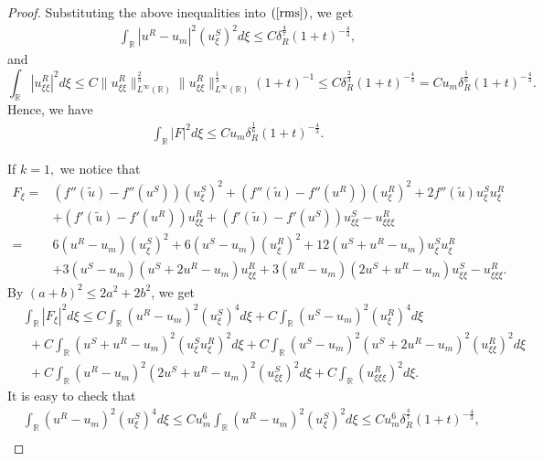 \documentclass[10pt,reqno]{amsart}
\numberwithin{equation}{section}
\begin{document}
\begin{proof}
		Substituting the above inequalities into $(\ref{rms})$, we get
		\begin{align*}
			\int_{\mathbb{R}} |u^R - u_m|^2 (u_{\xi}^S)^2 d\xi\leq C\delta_R^{\frac{4}{7}}(1+t)^{-\frac{4}{3}},
		\end{align*}
		and
		\begin{equation*} 
			\int_{\mathbb{R}} |u_{\xi \xi}^{R}|^2 d\xi \leq C \|u_{\xi \xi}^{R}\|_{L^\infty(\mathbb{R})}^{\frac{2}{3}} \|u_{\xi \xi}^{R}\|_{L^\infty(\mathbb{R})}^{\frac{1}{3}} (1+t)^{-1} \leq C\delta_R^{\frac{2}{3}} (1+t)^{-\frac{4}{3}}=Cu_m\delta_{R}^{\frac{1}{6}}(1+t)^{-\frac{4}{3}}.
		\end{equation*}
		Hence, we have
		\begin{align*}
			\int_{\mathbb{R}} |F|^2 d\xi\leq Cu_m\delta_R^{\frac{1}{6}}(1+t)^{-\frac{4}{3}}.
		\end{align*}\par
		If $k=1,$ we notice that
		\begin{align*}
			F_{\xi}=&\left(f''(\tilde{u})-f''(u^S)\right)(u^S_{\xi})^2+\left(f''(\tilde{u})-f''(u^R)\right)(u^R_{\xi})^2+2f''(\tilde{u})u^S_{\xi}u^R_{\xi}\\
			&+\left(f'(\tilde{u})-f'(u^R)\right)u^R_{\xi\xi}+\left(f'(\tilde{u})-f'(u^S)\right)u^S_{\xi\xi}-u^R_{\xi\xi\xi}\\
			=&6(u^R-u_m)(u_{\xi}^S)^2+6(u^S-u_m)(u^R_{\xi})^2+12(u^S+u^R-u_m)u_{\xi}^Su_{\xi}^R\\
			&+3(u^S-u_m)(u^S+2u^R-u_m)u_{\xi\xi}^R+3(u^R-u_m)(2u^S+u^R-u_m)u_{\xi\xi}^S-u_{\xi\xi\xi}^R.
		\end{align*}
		By $(a+b)^2\leq2a^2+2b^2$, we get
		\begin{equation}\label{Fxi}
			\begin{aligned}
				&\int_{\mathbb{R}}\left|F_{\xi}\right|^2d\xi
				\leq C\int_{\mathbb{R}}(u^R-u_m)^2(u_{\xi}^S)^4d\xi+C\int_{\mathbb{R}}(u^S-u_m)^2(u^R_{\xi})^4d\xi\\
				&\ \ +C\int_{\mathbb{R}}(u^S+u^R-u_m)^2(u_{\xi}^Su_{\xi}^R)^2d\xi+C\int_{\mathbb{R}}(u^S-u_m)^2(u^S+2u^R-u_m)^2(u_{\xi\xi}^R)^2d\xi\\
				&\ \ +C\int_{\mathbb{R}}(u^R-u_m)^2(2u^S+u^R-u_m)^2(u_{\xi\xi}^S)^2d\xi+C\int_{\mathbb{R}}(u^R_{\xi\xi\xi})^2d\xi.
			\end{aligned}
		\end{equation}
		It is easy to check that
		\begin{align*}
			&\int_{\mathbb{R}}(u^R-u_m)^2(u_{\xi}^S)^4d\xi\leq Cu_m^6\int_{\mathbb{R}}(u^R-u_m)^2(u_{\xi}^S)^2d\xi\leq Cu_m^6\delta_R^{\frac{4}{7}}(1+t)^{-\frac{4}{3}},\\

\end{align*}
\end{proof}
\end{document}
